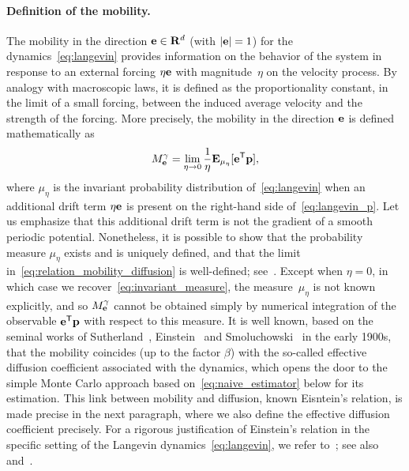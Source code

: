 \documentclass[11pt,a4paper]{article}
\begin{document}
\paragraph{Definition of the mobility.}
The mobility in the direction $\boldsymbol{\mathbf e} \in \mathbf R^d$ (with $|\boldsymbol{\mathbf e}| = 1$)
for the dynamics~\eqref{eq:langevin} provides information on the behavior of the system
in response to an external forcing $\eta \boldsymbol{\mathbf e}$ with magnitude~$\eta$ on the velocity process.
By analogy with macroscopic laws,
it is defined as the proportionality constant,
in the limit of a small forcing,
between the induced average velocity and the strength  of the forcing.
More precisely,
the mobility in the direction $\boldsymbol{\mathbf e}$ is defined mathematically as
\begin{equation}
    \label{eq:relation_mobility_diffusion}
    M^{\gamma}_{\boldsymbol{\mathbf e}} =  \lim_{\eta \to 0} \frac{1}{\eta}\mathbf{E}_{\mu_{\eta}} [\boldsymbol{\mathbf e}^\mathsf T \boldsymbol{\mathbf p}] ,
\end{equation}
where $\mu_{\eta}$ is the invariant probability distribution of~\eqref{eq:langevin} when
an additional drift term $\eta \boldsymbol{\mathbf e}$ is present on the right-hand side of~\eqref{eq:langevin_p}.
Let us emphasize that this additional drift term is not the gradient of a smooth periodic potential.
Nonetheless, it is possible to show that the probability measure $\mu_{\eta}$ exists and is uniquely defined,
and that the limit in~\eqref{eq:relation_mobility_diffusion} is well-defined;
see~\cite[Section 5]{MR3509213}.
Except when $\eta = 0$, in which case we recover~\eqref{eq:invariant_measure},
the measure~$\mu_{\eta}$ is not known explicitly,
and so $M_{\boldsymbol{\mathbf e}}^{\gamma}$ cannot be obtained simply by numerical integration of the observable $\boldsymbol{\mathbf e}^\mathsf T \boldsymbol{\mathbf p}$ with respect to this measure.
It is well known,
based on the seminal works of Sutherland~\cite{sutherland1905lxxv}, Einstein~\cite{einstein1905molekularkinetischen} and Smoluchowski~\cite{von1906kinetischen} in the early 1900s,
that the mobility coincides
(up to the factor $\beta$)
with the so-called effective diffusion coefficient associated with the dynamics,
which opens the door to the simple Monte Carlo approach based on~\eqref{eq:naive_estimator} below for its estimation.
This link between mobility and diffusion,
known Eisntein's relation,
is made precise in the next paragraph,
where we also define the effective diffusion coefficient precisely.
For a rigorous justification of Einstein's relation in the specific setting of the Langevin dynamics~\eqref{eq:langevin},
we refer to~\cite[Section~5.2]{MR3509213}; see also \cite[Section~3]{LMS16} and~\cite[Chapter~9]{pavliotis2011applied}.
\end{document}

